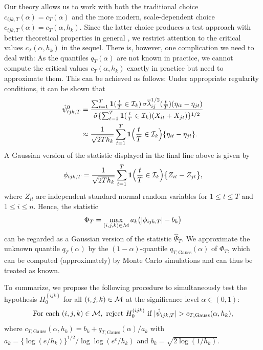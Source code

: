\documentclass[a4paper,12pt]{article}
\numberwithin{equation}{section}
\begin{document}
Our theory allows us to work with both the traditional choice $c_{ijk,T}(\alpha) = c_T(\alpha)$ and the more modern, scale-dependent choice $c_{ijk,T}(\alpha) = c_T(\alpha,h_k)$. Since the latter choice produces a test approach with better theoretical properties in general \citep[cp.][]{DuembgenSpokoiny2001}, we restrict attention to the critical values $c_T(\alpha,h_k)$ in the sequel. There is, however, one complication we need to deal with: As the quantiles $q_T(\alpha)$ are not known in practice, we cannot compute the critical values $c_T(\alpha,h_k)$ exactly in practice but need to approximate them. This can be achieved as follows: Under appropriate regularity conditions, it can be shown that 
\begin{align*}
\hat{\psi}_{ijk,T}^0 
 & = \frac{\sum\nolimits_{t=1}^T \boldsymbol{1}(\frac{t}{T} \in \mathcal{I}_k) \, \sigma \overline{\lambda}_{ij}^{1/2}(\frac{t}{T}) (\eta_{it} - \eta_{jt})}{ \hat{\sigma} \{ \sum\nolimits_{t=1}^T \boldsymbol{1}(\frac{t}{T} \in \mathcal{I}_k) (X_{it} + X_{jt}) \}^{1/2}} \\
 & \approx \frac{1}{\sqrt{2Th_k}} \sum\limits_{t=1}^T \boldsymbol{1}\Big(\frac{t}{T} \in \mathcal{I}_k\Big) \{ \eta_{it} - \eta_{jt} \}.
\end{align*} 
A Gaussian version of the statistic displayed in the final line above is given by 
\begin{equation*}
\phi_{ijk,T} = \frac{1}{\sqrt{2Th_k}} \sum\limits_{t=1}^T \boldsymbol{1}\Big(\frac{t}{T} \in \mathcal{I}_k\Big) \big\{ Z_{it} - Z_{jt} \big\},
\end{equation*}
where $Z_{it}$ are independent standard normal random variables for $1 \le t \le T$ and $1 \le i \le n$. Hence, the statistic 
\[ \Phi_T = \max_{(i,j,k) \in \mathcal{M}} a_k \big( |\phi_{ijk,T}| - b_k \big) \]
can be regarded as a Gaussian version of the statistic $\hat{\Psi}_T$. We approximate the unknown quantile $q_T(\alpha)$ by the $(1-\alpha)$-quantile $q_{T,\text{Gauss}}(\alpha)$ of $\Phi_T$, which can be computed (approximately) by Monte Carlo simulations and can thus be treated as known. 


To summarize, we propose the following procedure to simultaneously test the hypothesis $H_0^{(ijk)}$ for all $(i,j,k) \in \mathcal{M}$ at the significance level $\alpha \in (0,1)$: 
\begin{equation}\label{eq:test}
\text{For each } (i,j,k) \in \mathcal{M}, \text{ reject } H_0^{(ijk)} \text{ if } |\hat{\psi}_{ijk,T}| > c_{T,\text{Gauss}}(\alpha,h_k),
\end{equation}
where $c_{T,\text{Gauss}}(\alpha,h_k) = b_k + q_{T,\text{Gauss}}(\alpha)/a_k$ with $a_k = \{\log(e/h_k)\}^{1/2} / \log \log(e^e / h_k)$ and $b_k = \sqrt{2 \log(1/h_k)}$. 
\end{document}
